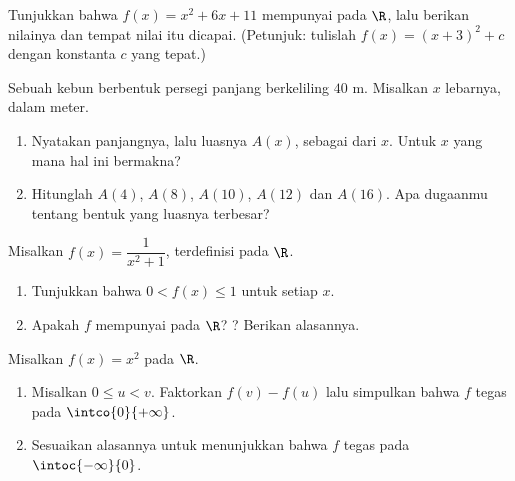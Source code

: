 \begin{exercise}[$\star\star$]\label{exo:g10:functions:7}
Tunjukkan bahwa  $f(x) = x^2 + 6x + 11$ mempunyai  pada $\R$,
lalu berikan nilainya dan tempat nilai itu dicapai. (Petunjuk: tulislah
$f(x) = (x + 3)^2 + c$ dengan konstanta $c$ yang tepat.)
\end{exercise}

\begin{exercise}[$\star\star$]\label{exo:g10:functions:8}
Sebuah kebun berbentuk persegi panjang berkeliling $40$ m. Misalkan $x$
lebarnya, dalam meter.
\begin{enumerate}
  \item Nyatakan panjangnya, lalu luasnya $A(x)$, sebagai  dari $x$.
        Untuk $x$ yang mana hal ini bermakna?
  \item Hitunglah $A(4)$, $A(8)$, $A(10)$, $A(12)$ dan $A(16)$. Apa dugaanmu
        tentang bentuk yang luasnya terbesar?
\end{enumerate}
\end{exercise}

\begin{exercise}[$\star\star$]\label{exo:g10:functions:9}
Misalkan $f(x) = \dfrac{1}{x^2 + 1}$, terdefinisi pada $\R$.
\begin{enumerate}
  \item Tunjukkan bahwa $0 < f(x) \leq 1$ untuk setiap  $x$.
  \item Apakah $f$ mempunyai  pada $\R$? ? Berikan alasannya.
\end{enumerate}
\end{exercise}

\begin{exercise}[$\star\star\star$]\label{exo:g10:functions:10}
Misalkan $f(x) = x^2$ pada $\R$.
\begin{enumerate}
  \item Misalkan $0 \leq u < v$. Faktorkan $f(v) - f(u)$ lalu simpulkan bahwa
        $f$ tegas  pada $\intco{0}{+\infty}$.
  \item Sesuaikan alasannya untuk menunjukkan bahwa $f$ tegas  pada
        $\intoc{-\infty}{0}$.
\end{enumerate}
\end{exercise}

